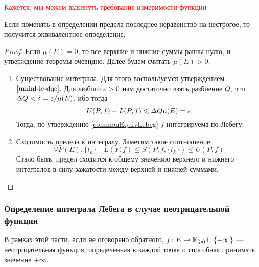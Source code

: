 \textcolor{red}{Кажется, мы можем выкинуть требование измеримости функции}

\begin{reminder}
	Если поменять в определении предела последнее неравенство на нестрогое, то получится эквивалентное определение.
\end{reminder}

\begin{proof}
	Если $\mu(E) = 0$, то все верхние и нижние суммы равны нулю, и утверждение теоремы очевидно. Далее будем считать $\mu(E) > 0$.
	\begin{enumerate}
		\item Существование интеграла. Для этого воспользуемся утверждением $\ref{uminl-le-dqe}$. Для любого $\varepsilon > 0$ нам достаточно взять разбиение $Q$, что $\Delta Q < \delta = \varepsilon / \mu(E)$, ибо тогда
		\[
			U(P, f) - L(P, f) \leqslant \Delta Q \mu(E) = \varepsilon
		\]
		Тогда, по утверждению \ref{commonEquivLebeg} $f$ интегрируема по Лебегу.
		
		\item Сходимость предела к интегралу. Заметим такое соотношение:
		\[
			\forall P(E), \{t_k\} \quad L(P, f) \le S(P, f, \{t_k\}) \le U(P, f)
		\]
		Стало быть, предел сходится к общему значению верхнего и нижнего интегралов в силу зажатости между верхней и нижней суммами.
	\end{enumerate}
\end{proof}

\subsubsection*{Определение интеграла Лебега в случае неотрицательной функции}

\begin{note}
	В рамках этой части, если не оговорено обратного, $f \colon E \to \mathbb{R}_{\geqslant 0} \cup \{+\infty\}$ --- неотрицательная функция, определенная в каждой точке и способная принимать значение $+\infty$.
\end{note}


